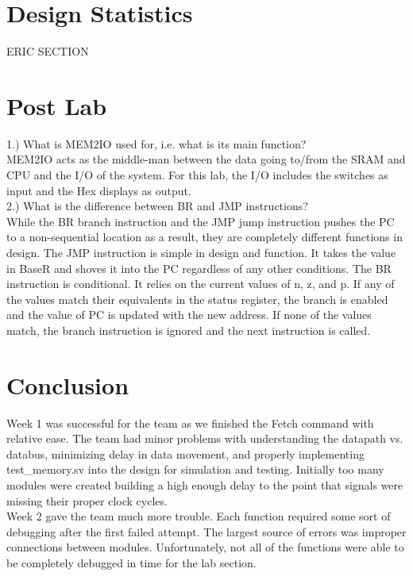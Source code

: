 \documentclass[journal, twocolumn, final,11pt,letterpaper]{IEEEtran}
\begin{document}
\section{Design Statistics}
ERIC SECTION

\section{Post Lab}

1.) What is MEM2IO used for, i.e. what is its main function? \\

MEM2IO acts as the middle-man between the data going to/from the SRAM and CPU and the I/O of the system.  For this lab, the I/O includes the switches as input and the Hex displays as output. \\  

2.) What is the difference between BR and JMP instructions?\\

While the BR branch instruction and the JMP jump instruction pushes the PC to a non-sequential location as a result, they are completely different functions in design.  The JMP instruction is simple in design and function.  It takes the value in BaseR and shoves it into the PC regardless of any other conditions.  The BR instruction is conditional.  It relies on the current values of n, z, and p.  If any of the values match their equivalents in the status register, the branch is enabled and the value of PC is updated with the new address.  If none of the values match, the branch instruction is ignored and the next instruction is called.  \\    

\section{Conclusion}
Week 1 was successful for the team as we finished the Fetch command with relative ease.  The team had minor problems with understanding the datapath vs. databus, minimizing delay in data movement, and properly implementing test\_memory.sv into the design for simulation and testing.  Initially too many modules were created building a high enough delay to the point that signals were missing their proper clock cycles.  \\

Week 2 gave the team much more trouble.  Each function required some sort of debugging after the first failed attempt.  The largest source of errors was improper connections between modules.  Unfortunately, not all of the functions were able to be completely debugged in time for the lab section. \\
\end{document}
